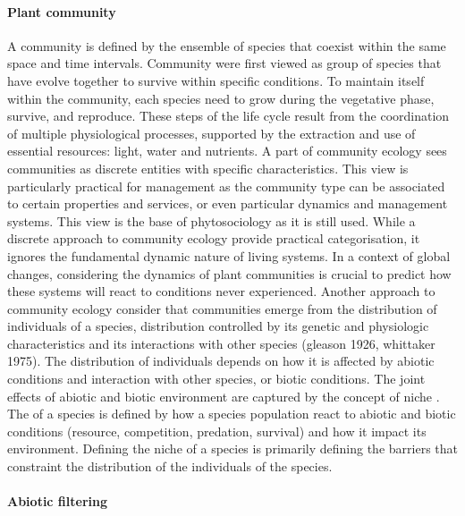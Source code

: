 \paragraph{Plant community}

A community is defined by the ensemble of species that coexist within the same space and time intervals. Community were first viewed as group of species that have evolve together to survive within specific conditions. To maintain itself within the community, each species need to grow during the vegetative phase, survive, and reproduce. These steps of the life cycle result from the coordination of multiple physiological processes, supported by the extraction and use of essential resources: light, water and nutrients. A part of community ecology sees communities as discrete entities with specific characteristics. This view is particularly practical for management as the community type can be associated to certain properties and services, or even particular dynamics and management systems. This view is the base of phytosociology as it is still used. While a discrete approach to community ecology provide practical categorisation, it ignores the fundamental dynamic nature of living systems. In a context of global changes, considering the dynamics of plant communities is crucial to predict how these systems will react to conditions never experienced. Another approach to community ecology consider that communities emerge from the distribution of individuals of a species, distribution controlled by its genetic and physiologic characteristics and its interactions with other species (gleason 1926, whittaker 1975). The distribution of individuals depends on how it is affected by abiotic conditions and interaction with other species, or biotic conditions. The joint effects of abiotic and biotic environment are captured by the concept of niche \parencite{elton_1927}. The  of a species is defined by how a species population react to abiotic and biotic conditions (resource, competition, predation, survival) and how it impact its environment. Defining the niche of a species is primarily defining the barriers that constraint the distribution of the individuals of the species.

\paragraph{Abiotic filtering}

